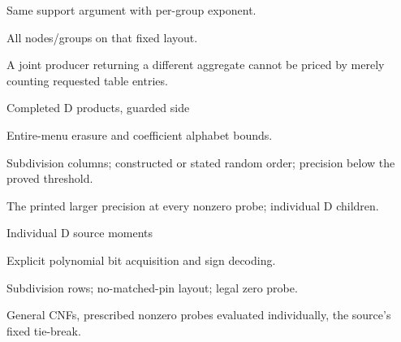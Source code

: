 \documentclass[11pt,a4paper]{article}
\newlength{\OfflineResearchTableWidth}
\newcommand{\OfflineResearchRow}{\par}
\newenvironment{OfflineResearchTable}{%
  \par\medskip\begingroup\small\setlength{\parindent}{0pt}%
  \setlength{\parskip}{3pt plus 1pt minus .5pt}%
  \setlength{\OfflineResearchTableWidth}{\linewidth}%
}{%
  \par\endgroup\medskip%
}
\begin{document}
\begin{OfflineResearchTable}
\begin{minipage}[t]{0.17955\OfflineResearchTableWidth}
\end{minipage}\hfill%
\begin{minipage}[t]{0.22680\OfflineResearchTableWidth}\raggedright
Same support argument with per-group
exponent.
\end{minipage}\hfill%
\begin{minipage}[t]{0.23625\OfflineResearchTableWidth}\raggedright
All nodes/groups on that fixed layout.
\end{minipage}\hfill%
\begin{minipage}[t]{0.30240\OfflineResearchTableWidth}\raggedright
A joint producer
returning a different aggregate cannot be priced by merely counting
requested table entries.
\end{minipage}%
\OfflineResearchRow
\noindent%
\begin{minipage}[t]{0.17955\OfflineResearchTableWidth}\raggedright
Completed D products, guarded side
\end{minipage}\hfill%
\begin{minipage}[t]{0.22680\OfflineResearchTableWidth}\raggedright
Entire-menu erasure and coefficient
alphabet bounds.
\end{minipage}\hfill%
\begin{minipage}[t]{0.23625\OfflineResearchTableWidth}\raggedright
Subdivision columns; constructed or stated random
order; precision below the proved threshold.
\end{minipage}\hfill%
\begin{minipage}[t]{0.30240\OfflineResearchTableWidth}\raggedright
The printed larger
precision at every nonzero probe; individual D children.
\end{minipage}%
\OfflineResearchRow
\noindent%
\begin{minipage}[t]{0.17955\OfflineResearchTableWidth}\raggedright
Individual D source moments
\end{minipage}\hfill%
\begin{minipage}[t]{0.22680\OfflineResearchTableWidth}\raggedright
Explicit polynomial bit acquisition and
sign decoding.
\end{minipage}\hfill%
\begin{minipage}[t]{0.23625\OfflineResearchTableWidth}\raggedright
Subdivision rows; no-matched-pin layout; legal zero
probe.
\end{minipage}\hfill%
\begin{minipage}[t]{0.30240\OfflineResearchTableWidth}\raggedright
General CNFs, prescribed nonzero probes evaluated individually,
the source's fixed tie-break.

\end{minipage}
\end{OfflineResearchTable}
\end{document}
